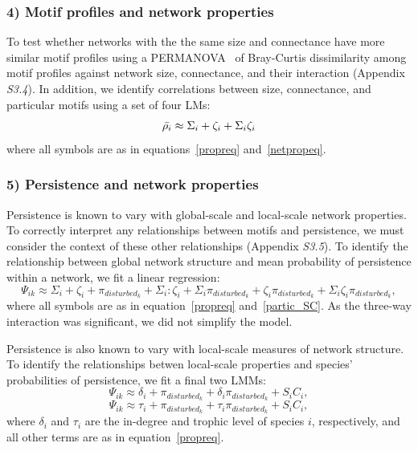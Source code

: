\documentclass[12pt]{article}
\begin{document}
\begin{spacing}{2.0}
    \subsubsection*{4) Motif profiles and network properties}
    
        To test whether networks with the the same size and connectance have more similar motif profiles using a PERMANOVA~\citep{Anderson2001} of Bray-Curtis dissimilarity among motif profiles against network size, connectance, and their interaction (Appendix \emph{S3.4}). 
        In addition, we identify correlations between size, connectance, and particular motifs using a set of four LMs:
        \begin{equation}
            \Bar{\rho_{i}} \approx \Sigma_{i} + \zeta_{i} + \Sigma_{i}\zeta_{i}
        \end{equation}
        where all symbols are as in equations~\ref{propreq} and~\ref{netpropeq}.
        
    \subsubsection*{5) Persistence and network properties}
        
        Persistence is known to vary with global-scale and local-scale network properties.
        To correctly interpret any relationships between motifs and persistence, we must consider the context of these other relationships (Appendix \emph{S3.5}).
        To identify the relationship between global network structure and mean probability of persistence within a network, we fit a linear regression:
            \begin{equation}
                \Psi_{ik} \approx \Sigma_{i} + \zeta_{i} + \pi_{disturbed_k} + \Sigma_{i}:\zeta_{i} + \Sigma_{i}\pi_{disturbed_k} + \zeta_{i}\pi_{disturbed_k} + \Sigma_{i}\zeta_{i}\pi_{disturbed_k},
                \label{SCeq}
            \end{equation}
        \noindent where all symbols are as in equation~\ref{propreq} and~\ref{partic_SC}.
        As the three-way interaction was significant, we did not simplify the model. 


        Persistence is also known to vary with local-scale measures of network structure. 
        To identify the relationships betwen local-scale properties and species' probabilities of persistence, we fit a final two LMMs:
        \begin{equation}
                \Psi_{ik} \approx \delta_{i} + \pi_{disturbed_k} + \delta_{i}\pi_{disturbed_k} +
                S_{i}C_{i} ,
                \label{degeq}
            \end{equation}
        \begin{equation}
                \Psi_{ik} \approx \tau_{i} + \pi_{disturbed_k} + \tau_{i}\pi_{disturbed_k} +
                S_{i}C_{i} ,
                \label{TLeq}
            \end{equation}
        \noindent where $\delta_{i}$ and $\tau_i$ are the in-degree and trophic level of species $i$, respectively, and all other terms are as in equation~\ref{propreq}. 



\end{spacing}
\end{document}
